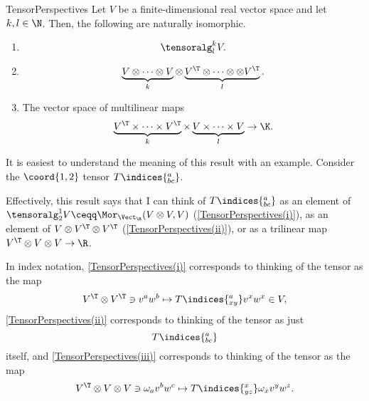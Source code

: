 \begin{thm}{}{TensorPerspectives}
	Let $V$ be a finite-dimensional real vector space and let $k,l\in \N$.  Then, the following are naturally isomorphic.
	\begin{enumerate}
		\item \label{TensorPerspectives(i)}
		\begin{equation}
			\tensoralg _l^kV.
		\end{equation}
		\item \label{TensorPerspectives(ii)}
		\begin{equation}
			\underbrace{V\otimes \cdots \otimes V}_k\otimes \underbrace{V^{\T}\otimes \cdots \otimes \otimes V^{\T}}_l.
		\end{equation}
		\item \label{TensorPerspectives(iii)}The vector space of multilinear maps
		\begin{equation}
			\underbrace{V^{\T}\times \cdots \times V^{\T}}_k\times \underbrace{V\times \cdots \times V}_l\rightarrow \K .
		\end{equation}
	\end{enumerate}
	\begin{rmk}
		It is easiest to understand the meaning of this result with an example.  Consider the $\coord{1,2}$ tensor $T\indices{^a_{bc}}$.
		
		Effectively, this result says that I can think of $T\indices{^a_{bc}}$ as an element of $\tensoralg _2^1V\ceqq \Mor _{\Vect _{\R}}(V\otimes V,V)$ (\cref{TensorPerspectives(i)}), as an element of $V\otimes V^{\T}\otimes V^{\T}$ (\cref{TensorPerspectives(ii)}), or as a trilinear map $V^{\T}\otimes V\otimes V\rightarrow \R$.
		
		In index notation, \cref{TensorPerspectives(i)} corresponds to thinking of the tensor as the map
		\begin{equation}
			V^{\T}\otimes V^{\T}\ni v^aw^b\mapsto T\indices{^a_{xy}}v^xw^x\in V,
		\end{equation}
		\cref{TensorPerspectives(ii)} corresponds to thinking of the tensor as just
		\begin{equation}
			T\indices{^a_{bc}}
		\end{equation}
		itself, and \cref{TensorPerspectives(iii)} corresponds to thinking of the tensor as the map
		\begin{equation}
			V^{\T}\otimes V\otimes V\ni \omega _av^bw^c\mapsto T\indices{^x_{yz}}\omega _xv^yw^z.
		\end{equation}
		

\end{rmk}
\end{thm}
